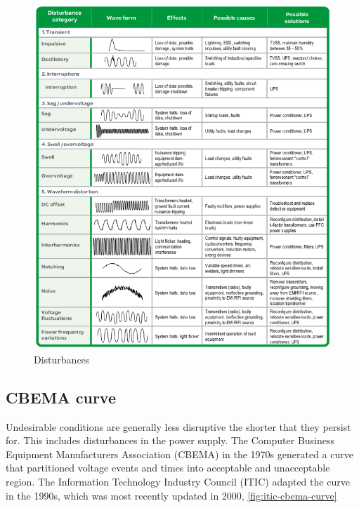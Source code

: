 \documentclass{pgnotes}
\begin{document}
\begin{figure}[htbp]
  \centering
  \includegraphics[width=0.9\linewidth]{disturbances}
  \caption{Disturbances}
  \label{fig:disturbances}
\end{figure}

\clearpage
\newpage

\subsection{CBEMA curve}

Undesirable conditions are generally less disruptive the shorter that they persist for.
This includes disturbances in the power supply.
The Computer Business Equipment Manufacturers Association (CBEMA) in the 1970s generated a curve that partitioned voltage events and times into acceptable and unacceptable region.
The Information Technology Industry Council (ITIC) adapted the curve in the 1990s, which was most recently updated in 2000, \autoref{fig:itic-cbema-curve}
\end{document}
